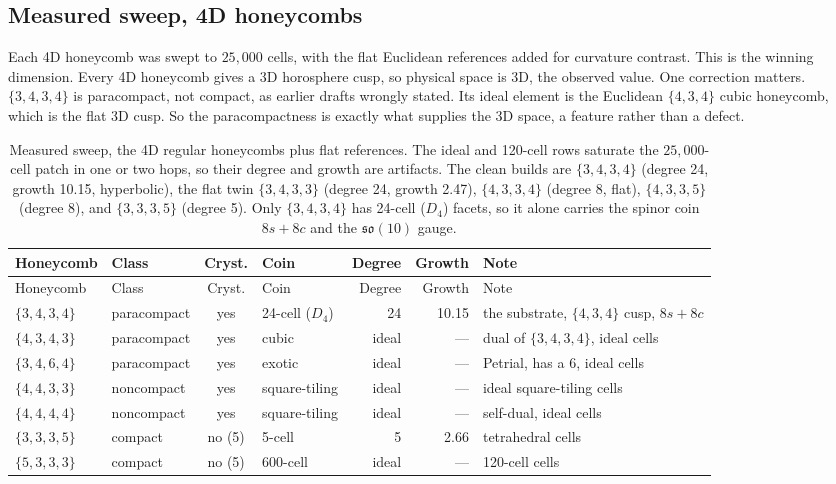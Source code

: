 \subsection{Measured sweep, 4D honeycombs}

Each 4D honeycomb was swept to $25{,}000$ cells, with the flat Euclidean references added for curvature contrast.
This is the winning dimension. Every 4D honeycomb gives a 3D horosphere cusp, so physical space is 3D, the
observed value. One correction matters. $\{3,4,3,4\}$ is paracompact, not compact, as earlier drafts wrongly
stated. Its ideal element is the Euclidean $\{4,3,4\}$ cubic honeycomb, which is the flat 3D cusp. So the
paracompactness is exactly what supplies the 3D space, a feature rather than a defect.

{\small
\begin{longtable}{l p{0.85in} c l r r p{1.7in}}
\toprule
Honeycomb & Class & Cryst. & Coin & Degree & Growth & Note \\
\midrule
\endfirsthead
\toprule
Honeycomb & Class & Cryst. & Coin & Degree & Growth & Note \\
\midrule
\endhead
\bottomrule
\endfoot
\bottomrule
\caption{Measured sweep, the 4D regular honeycombs plus flat references. The ideal and 120-cell rows saturate the
$25{,}000$-cell patch in one or two hops, so their degree and growth are artifacts. The clean builds are
$\{3,4,3,4\}$ (degree 24, growth 10.15, hyperbolic), the flat twin $\{3,4,3,3\}$ (degree 24, growth 2.47),
$\{4,3,3,4\}$ (degree 8, flat), $\{4,3,3,5\}$ (degree 8), and $\{3,3,3,5\}$ (degree 5). Only $\{3,4,3,4\}$ has
24-cell ($D_4$) facets, so it alone carries the spinor coin $8s + 8c$ and the $\mathfrak{so}(10)$ gauge.}
\label{tab:sweep-4d}
\endlastfoot
$\{3,4,3,4\}$ & paracompact & yes & 24-cell ($D_4$) & 24 & 10.15 & the substrate, $\{4,3,4\}$ cusp, $8s+8c$ \\
$\{4,3,4,3\}$ & paracompact & yes & cubic & ideal & --- & dual of $\{3,4,3,4\}$, ideal cells \\
$\{3,4,6,4\}$ & paracompact & yes & exotic & ideal & --- & Petrial, has a 6, ideal cells \\
$\{4,4,3,3\}$ & noncompact & yes & square-tiling & ideal & --- & ideal square-tiling cells \\
$\{4,4,4,4\}$ & noncompact & yes & square-tiling & ideal & --- & self-dual, ideal cells \\
$\{3,3,3,5\}$ & compact & no (5) & 5-cell & 5 & 2.66 & tetrahedral cells \\
$\{5,3,3,3\}$ & compact & no (5) & 600-cell & ideal & --- & 120-cell cells \\

\end{longtable}}

